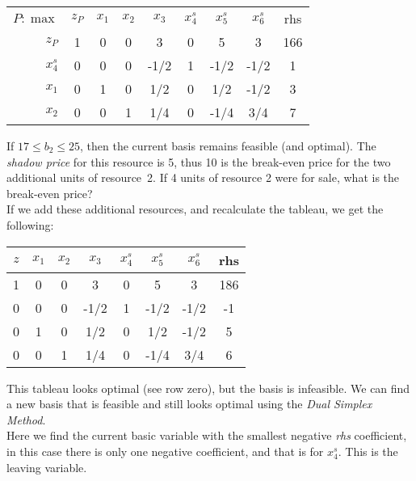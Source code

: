 \begin{center} \begin{tabular} {r|c|c|c|c|c|c|c|c|} \cline{2-9}  
$P:\max$&$z_P$ & $x_1$ & $x_2$ & $x_3$ 	& $x^{s}_4$	& $x^{s}_5$ & $x^{s}_6$ & rhs \\ \cline{2-9}  \cline{2-9}   
$z_P$ 	& 1   & 0      & 0     & 3      	& 0    	& 5     	& 3     	& 166  \\ \cline{2-9}  
$x^{s}_4$	& 0  	& 0     	& 0     	& -1/2   	& 1    	& -1/2  	& -1/2  	& 1   	\\ \cline{2-9} 
$x_1$	& 0  & 1     & 0     & 1/2    	& 0    	& 1/2   	& -1/2  	& 3    \\ \cline{2-9}  
$x_2$	& 0  & 0     	& 1     	& 1/4    	& 0    	& -1/4  & 3/4   	& 7    \\ \cline{2-9} 
\end{tabular}  \end{center} 



\medskip If $17 \le b_2 \le 25$, then the current basis remains feasible (and optimal). The {\it shadow price} for this resource is 5, thus 10 is the break-even price for the two additional units of resource~2. If 4 units of resource 2 were for sale, what is the break-even price?  \\

If we add these additional resources, and recalculate the tableau, we get the following:
\begin{center} \begin{tabular} {|c|c|c|c|c|c|c|c|}
\hline $z$ & $x_1$ & $x_2$ & $x_3$ & $x^s_4$ & $x^s_5$ & $x^s_6$ & rhs   \\ \hline
\hline  1  & 0     & 0     & 3      & 0    & 5     & 3     & 186   \\
\hline  0  & 0     & 0     & -1/2   & 1    & -1/2  & -1/2  & -1     \\
\hline  0  & 1     & 0     & 1/2    & 0    & 1/2   & -1/2  & 5    \\
\hline  0  & 0     & 1     & 1/4    & 0    & -1/4  & 3/4   & 6     \\ \hline
\end{tabular} \end{center} 
This tableau looks optimal (see row zero), but the basis is infeasible.  We can find a new basis that is feasible and still looks optimal using the {\it Dual Simplex Method}. \\

Here we find the current basic variable with the smallest negative {\it rhs} coefficient, in this case there is only one negative coefficient, and that is for $x^s_4$.  This is the leaving variable.  \\

